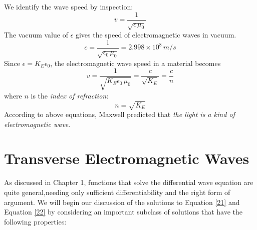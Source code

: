 \documentclass[12pt]{article}
\numberwithin{equation}{section}
\begin{document}
We identify the wave speed by inspection:
\[
    v=\frac{1}{\sqrt{\epsilon\,\mu_0}}
\]
The vacuum value of $\epsilon$ gives the speed of electromagnetic waves in vacuum.
\begin{equation}
    c=\frac{1}{\sqrt{\epsilon_0\,\mu_0}}=2.998\times10^8\, m/s\label{23}
\end{equation}
Since $\epsilon=K_E\epsilon_0$, the electromagnetic wave speed in a material becomes
\begin{equation}
    v=\frac{1}{\sqrt{K_E\epsilon_0\,\mu_0}}=\frac{c}{\sqrt{K_E}}=\frac{c}{n}\label{24}   
\end{equation}
where $n$ is the \emph{index of refraction}:
\begin{equation}
    n=\sqrt{K_E}\label{25}
\end{equation}
According to above equations, Maxwell predicted that \emph{the light is a kind of electromagnetic wave}. 
\newpage
\section{Transverse Electromagnetic Waves}
As discussed in Chapter 1, functions that solve the differential wave equation are quite general,needing only sufficient differentiability and the right form of argument.
We will begin our discussion of the solutions to Equation \eqref{21} and Equation \eqref{22} by considering an important subclass of solutions that have the following properties:
\end{document}
